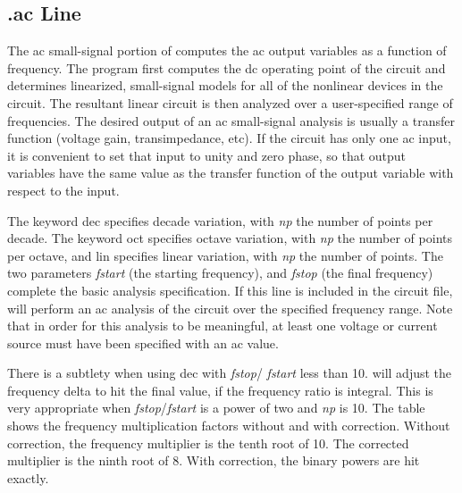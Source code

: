 \subsection{{\vt .ac} Line}
\label{acline}


The ac small-signal portion of {\WRspice} computes the ac output
variables as a function of frequency.  The program first computes the
dc operating point of the circuit and determines linearized,
small-signal models for all of the nonlinear devices in the circuit. 
The resultant linear circuit is then analyzed over a user-specified
range of frequencies.  The desired output of an ac small-signal
analysis is usually a transfer function (voltage gain, transimpedance,
etc).  If the circuit has only one ac input, it is convenient to set
that input to unity and zero phase, so that output variables have the
same value as the transfer function of the output variable with
respect to the input.


The keyword {\vt dec} specifies decade variation, with {\it np\/} the
number of points per decade.  The keyword {\vt oct} specifies octave
variation, with {\it np\/} the number of points per octave, and {\vt
lin} specifies linear variation, with {\it np\/} the number of points. 
The two parameters {\it fstart\/} (the starting frequency), and {\it
fstop\/} (the final frequency) complete the basic analysis
specification.  If this line is included in the circuit file,
{\WRspice} will perform an ac analysis of the circuit over the
specified frequency range.  Note that in order for this analysis to be
meaningful, at least one voltage or current source must have been
specified with an {\vt ac} value.

There is a subtlety when using {\vt dec} with {\it fstop\/}/{\it
fstart} less than 10.  {\WRspice} will adjust the frequency delta to
hit the final value, if the frequency ratio is integral.  This is very
appropriate when {\it fstop\/}/{\it fstart} is a power of two and {\it
np} is 10.  The table shows the frequency multiplication factors
without and with correction.  Without correction, the frequency
multiplier is the tenth root of 10.  The corrected multiplier is the
ninth root of 8.  With correction, the binary powers are hit exactly.

